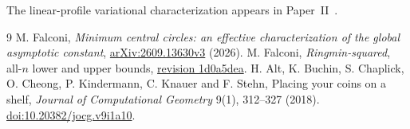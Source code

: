 \documentclass[11pt,letterpaper]{article}
\begin{document}

\smallskip
\noindent The linear-profile variational characterization appears
in Paper~II~\cite{profilePaperII}.
\begin{thebibliography}{9}
M. Falconi, \emph{Minimum central circles: an effective characterization of
the global asymptotic constant}, \href{https://arxiv.org/abs/2609.13630v3}
{arXiv:2609.13630v3} (2026).
M. Falconi, \emph{Ringmin-squared}, all-\(n\) lower and upper bounds,
\href{https://github.com/falker47/ringmin-squared/blob/1d0a5dea10cd09783a9c0e2d54ede79b790cce2b/research/ALL_N_LOWER_BOUND.md}
{revision 1d0a5dea}.
H. Alt, K. Buchin, S. Chaplick, O. Cheong, P. Kindermann, C. Knauer
and F. Stehn, Placing your coins on a shelf,
\emph{Journal of Computational Geometry} 9(1), 312--327 (2018).
\href{https://doi.org/10.20382/jocg.v9i1a10}{doi:10.20382/jocg.v9i1a10}.
\end{thebibliography}
\end{document}
